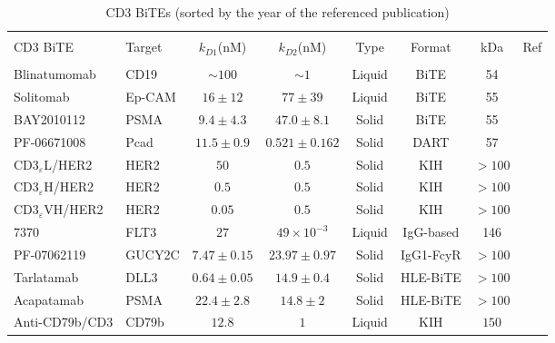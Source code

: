 \begin{landscape}
\begin{table}[ht]
	\centering
	\caption[\ac{BiTE} molecules]{CD3 \ac{BiTE}s (sorted by the year of the referenced publication)}
	\begin{tabular}{l l c c c c c r} 
		\hline \vspace{-7pt}\\
		CD3 \ac{BiTE} & Target & $k_{D1}$(nM) & $k_{D2}$(nM) & Type & Format & kDa & Ref \\ [0.5ex] 
		\hline \vspace{-7pt}\\
		Blinatumomab & CD19 & $\sim 100$ & $\sim 1$  & Liquid & BiTE & 54 & \cite{dreier2002extremely}  \\
		Solitomab & Ep-CAM & $16\pm12$ & $77\pm39$ & Liquid & BiTE & 55 & \cite{brischwein2006mt110}  \\
		BAY2010112 & PSMA & $9.4\pm4.3$ & $47.0\pm8.1$ & Solid & BiTE & 55 & \cite{friedrich2012regression} \\
		PF-06671008 & Pcad & $11.5\pm0.9$ & $0.521\pm0.162$ & Solid & DART & 57 & \cite{root2016development}  \\
		CD3$_\varepsilon$L/HER2 & HER2 & $50$ & $0.5$ & Solid & KIH & $>100$ & \cite{mandikian2018relative}  \\
		CD3$_\varepsilon$H/HER2 & HER2 & $0.5$ & $0.5$ & Solid & KIH & $>100$ & \cite{mandikian2018relative}  \\
		CD3$_\varepsilon$VH/HER2 & HER2 & $0.05$ & $0.5$ & Solid & KIH & $>100$ & \cite{mandikian2018relative}  \\
		7370 & FLT3 & $27$ & $49\times10^{-3}$ & Liquid & IgG-based & 146 & \cite{yeung2020optimized}  \\
		PF-07062119 & GUCY2C & $7.47\pm0.15$ & $23.97\pm0.97$ & Solid & IgG1-FcyR & $>100$ & \cite{mathur2020novel}  \\
		Tarlatamab & DLL3 & $0.64\pm0.05$ & $14.9\pm0.4$ & Solid & HLE-BiTE & $>100$ & \cite{giffin2021amg} \\
		Acapatamab & PSMA & $22.4\pm2.8$ & $14.8\pm2$ & Solid & HLE-BiTE & $>100$ & \cite{deegen2021psma} \\
		Anti-CD79b/CD3 & CD79b & $12.8$ & $1$ & Liquid & KIH & $150$ & \cite{yadav2022nonclinical} \\
		\hline
	\end{tabular}
	\label{table:bites}
\end{table}
\end{landscape}

